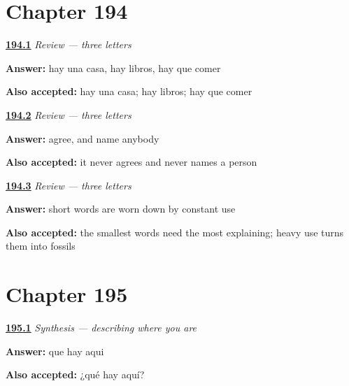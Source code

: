 \section*{Chapter 194}

\noindent\begin{minipage}[t]{\linewidth}
\raggedright
\hyperlink{review-ES-C54-repaso-hay-three}{\textbf{194.1}} \emph{Review — three letters}\par
\small \textbf{Answer:} hay una casa, hay libros, hay que comer\par
\footnotesize \textbf{Also accepted:} hay una casa; hay libros; hay que comer
\end{minipage}\par\medskip

\noindent\begin{minipage}[t]{\linewidth}
\raggedright
\hyperlink{review-ES-C54-repaso-hay-never}{\textbf{194.2}} \emph{Review — three letters}\par
\small \textbf{Answer:} agree, and name anybody\par
\footnotesize \textbf{Also accepted:} it never agrees and never names a person
\end{minipage}\par\medskip

\noindent\begin{minipage}[t]{\linewidth}
\raggedright
\hyperlink{review-ES-C54-repaso-hay-small}{\textbf{194.3}} \emph{Review — three letters}\par
\small \textbf{Answer:} short words are worn down by constant use\par
\footnotesize \textbf{Also accepted:} the smallest words need the most explaining; heavy use turns them into fossils
\end{minipage}\par\medskip

\section*{Chapter 195}

\noindent\begin{minipage}[t]{\linewidth}
\raggedright
\hyperlink{review-ES-C54-sintesis-lo-que-hay-ask}{\textbf{195.1}} \emph{Synthesis — describing where you are}\par
\small \textbf{Answer:} que hay aqui\par
\footnotesize \textbf{Also accepted:} ¿qué hay aquí?
\end{minipage}\par\medskip

